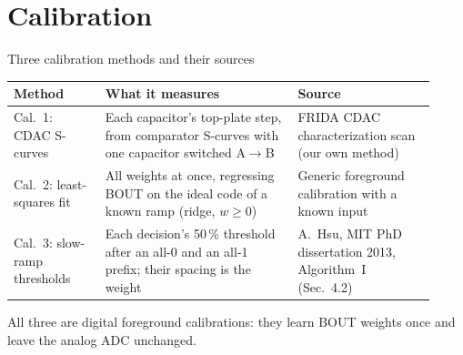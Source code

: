 \section[Calibration]{Calibration}

\begin{frame}{Three calibration methods and their sources}
  \centering
  {\small
  \begin{tabular}{@{}>{\raggedright\arraybackslash}p{0.20\linewidth}>{\raggedright\arraybackslash}p{0.42\linewidth}>{\raggedright\arraybackslash}p{0.30\linewidth}@{}}
    \toprule
    Method & What it measures & Source \\
    \midrule
    Cal.\ 1: CDAC S-curves & Each capacitor's top-plate step, from comparator S-curves with one capacitor switched A$\to$B & FRIDA CDAC characterization scan (our own method) \\
    Cal.\ 2: least-squares fit & All weights at once, regressing BOUT on the ideal code of a known ramp (ridge, $w \geq 0$) & Generic foreground calibration with a known input \\
    Cal.\ 3: slow-ramp thresholds & Each decision's 50\,\% threshold after an all-0 and an all-1 prefix; their spacing is the weight & A.\ Hsu, MIT PhD dissertation 2013, Algorithm~I (Sec.~4.2) \\
    \bottomrule
  \end{tabular}
  }
  \par\medskip
  {\small All three are digital foreground calibrations: they learn BOUT weights once and leave the analog ADC unchanged.}
\end{frame}

